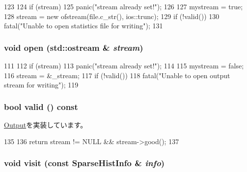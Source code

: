 \begin{DoxyCode}
123 {
124     if (stream)
125         panic("stream already set!");
126 
127     mystream = true;
128     stream = new ofstream(file.c_str(), ios::trunc);
129     if (!valid())
130         fatal("Unable to open statistics file for writing\n");
131 }
\end{DoxyCode}
\hypertarget{classStats_1_1Text_a4690db80dedba85cd71ca3fb7b350bbf}{
\subsubsection[{open}]{\setlength{\rightskip}{0pt plus 5cm}void open (std::ostream \& {\em stream})}}
\label{classStats_1_1Text_a4690db80dedba85cd71ca3fb7b350bbf}



\begin{DoxyCode}
111 {
112     if (stream)
113         panic("stream already set!");
114 
115     mystream = false;
116     stream = &_stream;
117     if (!valid())
118         fatal("Unable to open output stream for writing\n");
119 }
\end{DoxyCode}
\hypertarget{classStats_1_1Text_a8d985300b138b6c5556ab17ed4df3b38}{
\subsubsection[{valid}]{\setlength{\rightskip}{0pt plus 5cm}bool valid () const}}
\label{classStats_1_1Text_a8d985300b138b6c5556ab17ed4df3b38}


\hyperlink{structStats_1_1Output_ad9248394f673632ebda5b9c455e464f2}{Output}を実装しています。


\begin{DoxyCode}
135 {
136     return stream != NULL && stream->good();
137 }
\end{DoxyCode}
\hypertarget{classStats_1_1Text_a589b1491b14568a2285a6ee57465a639}{
\subsubsection[{visit}]{\setlength{\rightskip}{0pt plus 5cm}void visit (const {\bf SparseHistInfo} \& {\em info})}}
\label{classStats_1_1Text_a589b1491b14568a2285a6ee57465a639}


